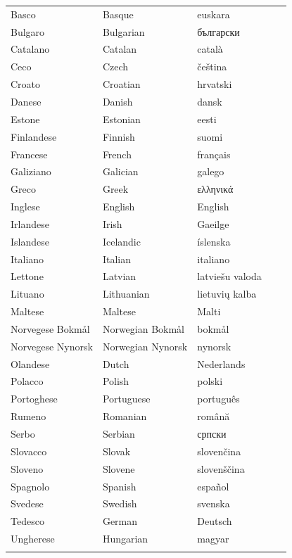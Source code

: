 \documentclass[]{../../metanetpaper}
\begin{document}
\vspace*{-5mm}
\centering
  \setlength{\tabcolsep}{2em}
  \begin{tabularx}{\textwidth}{lllll} \toprule\addlinespace
  Basco & Basque & euskara\\
  Bulgaro & Bulgarian & български\\
  Catalano & Catalan & català\\
  Ceco & Czech & čeština\\
  Croato & Croatian & hrvatski\\
  Danese & Danish & dansk\\
  Estone & Estonian & eesti\\
  Finlandese & Finnish & suomi\\
  Francese & French & français\\
  Galiziano & Galician & galego\\
  Greco & Greek & ελληνικά\\
  Inglese & English & English\\
  Irlandese & Irish & Gaeilge\\
  Islandese & Icelandic & íslenska\\
  Italiano & Italian & italiano\\
  Lettone & Latvian & latviešu valoda\\
  Lituano & Lithuanian & lietuvių kalba\\
  Maltese & Maltese & Malti\\
  Norvegese Bokmål & Norwegian Bokmål & bokmål\\
  Norvegese Nynorsk & Norwegian Nynorsk & nynorsk\\
  Olandese & Dutch & Nederlands\\
  Polacco & Polish & polski\\
  Portoghese & Portuguese & português\\
  Rumeno & Romanian & română\\
  Serbo & Serbian & српски\\
  Slovacco & Slovak & slovenčina\\
  Sloveno & Slovene & slovenščina\\
  Spagnolo & Spanish & español\\
  Svedese & Swedish & svenska\\
  Tedesco & German & Deutsch\\
  Ungherese & Hungarian & magyar\\ \addlinespace \bottomrule
\end{tabularx}
\end{document}
